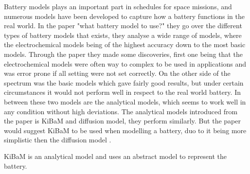 



Battery models plays an important part in schedules for space missions, and numerous models have been developed to capture how a battery functions in the real world. In the paper "what battery model to use?"\cite{battery_model} they go over the different types of battery models that exists, they analyse a wide range of models, where the electrochemical models being of the highest accuracy down to the most basic models. 
Through the paper\cite{battery_model} they made some discoveries, first one being that the electrochemical models were often way to complex to be used in applications and was error prone if all setting were not set correctly. On the other side of the spectrum was the basic models which gave fairly good results, but under certain circumstances it would not perform well in respect to the real world battery. In between these two models are the analytical models, which seems to work well in any condition without high deviations. The analytical models introduced from the paper is KiBaM and diffusion model, they perform similarly. But the paper would suggest KiBaM to be used when modelling a battery, duo to it being more simplistic then the diffusion model \cite{battery_model}.

KiBaM is an analytical model and uses an abstract model to represent the battery.